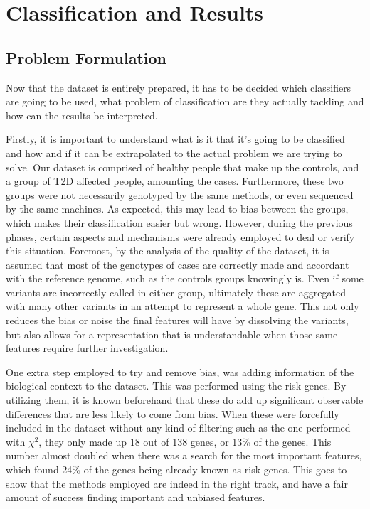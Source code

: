 
\chapter{Classification and Results} \label{chapter:results}


\section{Problem Formulation}

Now that the dataset is entirely prepared, it has to be decided which classifiers are going to be used, what problem of classification are they actually tackling and how can the results be interpreted. 

Firstly, it is important to understand what is it that it's going to be classified and how and if it can be extrapolated to the actual problem we are trying to solve. Our dataset is comprised of healthy people that make up the controls, and a group of \gls{T2D} affected people, amounting the cases. Furthermore, these two groups were not necessarily genotyped by the same methods, or even sequenced by the same machines. As expected, this may lead to bias between the groups, which makes their classification easier but wrong. However, during the previous phases, certain aspects and mechanisms were already employed to deal or verify this situation. Foremost, by the analysis of the quality of the dataset, it is assumed that most of the genotypes of cases are correctly made and accordant with the reference genome, such as the controls groups knowingly is. Even if some variants are incorrectly called in either group, ultimately these are aggregated with many other variants in an attempt to represent a whole gene. This not only reduces the bias or noise the final features will have by dissolving the variants, but also allows for a representation that is understandable when those same features require further investigation. 

One extra step employed to try and remove bias, was adding information of the biological context to the dataset. This was performed using the risk genes. By utilizing them, it is known beforehand that these do add up significant observable differences that are less likely to come from bias. When these were forcefully included in the dataset without any kind of filtering such as the one performed with $\chi^2$, they only made up 18 out of 138 genes, or 13\% of the genes. This number almost doubled when there was a search for the most important features, which found 24\% of the genes being already known as risk genes. This goes to show that the methods employed are indeed in the right track, and have a fair amount of success finding important and unbiased features.

